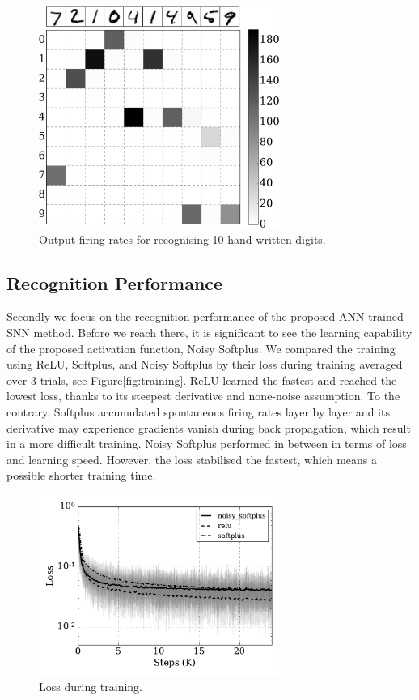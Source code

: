 		\begin{figure}[tbp!]
			\centering
			\includegraphics[width=0.7\textwidth]{pics_iconip/7.pdf}
			\caption{Output firing rates for recognising 10 hand written digits.}
			\label{Fig:out}
		\end{figure}
	
	\subsection{Recognition Performance}
	Secondly we focus on the recognition performance of the proposed ANN-trained SNN method.
	Before we reach there, it is significant to see the learning capability of the proposed activation function, Noisy Softplus.
	We compared the training using ReLU, Softplus, and Noisy Softplus by their loss during training averaged over 3 trials, see Figure\ref{fig:training}.
	ReLU learned the fastest and reached the lowest loss, thanks to its steepest derivative and none-noise assumption.
	To the contrary, Softplus accumulated spontaneous firing rates layer by layer and its derivative may experience gradients vanish during back propagation, which result in a more difficult training.
	Noisy Softplus performed in between in terms of loss and learning speed.
	However, the loss stabilised the fastest, which means a possible shorter training time.
	\begin{figure}[tbp!]
		\centering
		\includegraphics[width=0.7\textwidth]{pics_iconip/8.pdf}
		\caption{Loss during training.}
		\label{Fig:loss_ns}
	\end{figure}
	
